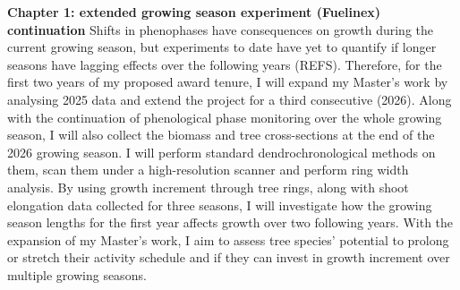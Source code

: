 \documentclass[12pt]{article}
\begin{document}
\textbf{Chapter 1: extended growing season experiment (Fuelinex) continuation}
Shifts in phenophases have consequences on growth during the current growing season, but experiments to date have yet to quantify if longer seasons have lagging effects over the following years (REFS). Therefore, for the first two years of my proposed award tenure, I will expand my Master's work by analysing 2025 data and extend the project for a third consecutive (2026). Along with the continuation of phenological phase monitoring over the whole growing season, I will also collect the biomass and tree cross-sections at the end of the 2026 growing season. I will perform standard dendrochronological methods on them, scan them under a high-resolution scanner and perform ring width analysis. By using growth increment through tree rings, along with shoot elongation data collected for three seasons, I will investigate how the growing season lengths for the first year affects growth over two following years. With the expansion of my Master's work, I aim to assess tree species’ potential to prolong or stretch their activity schedule and if they can invest in growth increment over multiple growing seasons. 
\end{document}
